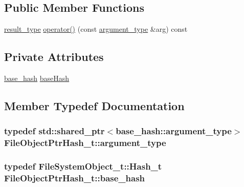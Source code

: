 \subsection*{Public Member Functions}
\begin{DoxyCompactItemize}
\item 
\hyperlink{struct_file_object_ptr_hash__t_aee959426ba7d87767495fd80f1ca4529}{result\+\_\+type} \hyperlink{struct_file_object_ptr_hash__t_a424fdee1a2ef82b544085bfb5bfcbd38}{operator()} (const \hyperlink{struct_file_object_ptr_hash__t_a65b403ca64b6693ccb7f754db69a19e3}{argument\+\_\+type} \&arg) const 
\end{DoxyCompactItemize}
\subsection*{Private Attributes}
\begin{DoxyCompactItemize}
\item 
\hyperlink{struct_file_object_ptr_hash__t_ad52fb59b8a618654a5c5749fb010824f}{base\+\_\+hash} \hyperlink{struct_file_object_ptr_hash__t_a28daecbb208615e8770f088df6629c6c}{base\+Hash}
\end{DoxyCompactItemize}


\subsection{Member Typedef Documentation}
\subsubsection[{\texorpdfstring{argument\+\_\+type}{argument_type}}]{\setlength{\rightskip}{0pt plus 5cm}typedef std\+::shared\+\_\+ptr$<${\bf base\+\_\+hash\+::argument\+\_\+type}$>$ {\bf File\+Object\+Ptr\+Hash\+\_\+t\+::argument\+\_\+type}}\hypertarget{struct_file_object_ptr_hash__t_a65b403ca64b6693ccb7f754db69a19e3}{}\label{struct_file_object_ptr_hash__t_a65b403ca64b6693ccb7f754db69a19e3}
\subsubsection[{\texorpdfstring{base\+\_\+hash}{base_hash}}]{\setlength{\rightskip}{0pt plus 5cm}typedef {\bf File\+System\+Object\+\_\+t\+::\+Hash\+\_\+t} {\bf File\+Object\+Ptr\+Hash\+\_\+t\+::base\+\_\+hash}}\hypertarget{struct_file_object_ptr_hash__t_ad52fb59b8a618654a5c5749fb010824f}{}\label{struct_file_object_ptr_hash__t_ad52fb59b8a618654a5c5749fb010824f}
